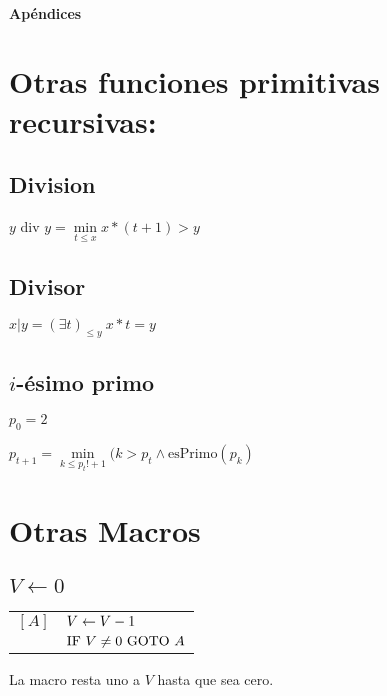 \paragraph{Apéndices}
\section{Otras funciones primitivas recursivas:}\label{appendix::funcpr}
\begin{multicols}{2}
\subsection{Division}
$y$ div $y = \min\limits_{t \leq x} x*(t+1) > y $

\subsection{Divisor}
$x | y = (\exists t)_{\leq y}~x*t = y $

\subsection{$i$-ésimo primo}
$p_0 = 2$

$p_{t+1} = \min\limits_{k \leq p_t!+1}(k > p_t \land \text{esPrimo}(p_k)$
\end{multicols}
\section{Otras Macros} \label{appendix::otrasMacros}
\setlength\columnsep{10pt}

\subsection{$V \leftarrow 0$}\label{appendix::otrasMAcros::resetVariable}
\begin{multicols}{2}
	\begin{center}
	\begin{tabular}{ll}
	$[A]$ & $V \leftarrow V - 1$ \\
	& $\text{IF }V \neq 0 \text{ GOTO } A$
\end{tabular}

	\end{center}
	
	\columnbreak
La macro resta uno a $V$ hasta que sea cero.
\end{multicols}

